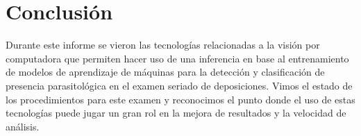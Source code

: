 \documentclass[letter,12pt]{report}
\begin{document}
\chapter{Conclusión}\label{conclusion}
Durante este informe se vieron las tecnologías relacionadas a la visión por computadora
que permiten hacer uso de una inferencia en base al entrenamiento de modelos de
aprendizaje de máquinas para la detección y clasificación de presencia parasitológica en
el examen seriado de deposiciones. Vimos el estado de los procedimientos para este examen
y reconocimos el punto donde el uso de estas tecnologías puede jugar un gran rol en la
mejora de resultados y la velocidad de análisis.

\renewcommand{\refname}{Referencias}



%
%
\end{document}
